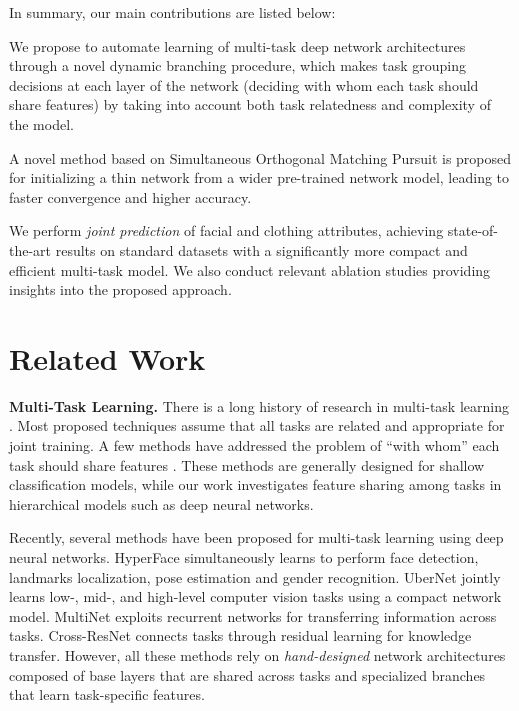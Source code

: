 \documentclass[10pt,twocolumn,letterpaper]{article}
\begin{document}
\noindent In summary, our main contributions are listed below:
\begin{compactitem}[$\circ$]
	\item We propose to automate learning of multi-task deep network architectures through a novel dynamic branching procedure,
	which makes task grouping decisions at each layer of the network (deciding with whom each task should share features) by 
	taking into account both task relatedness and complexity of the model.
	
	\item A novel method based on Simultaneous Orthogonal Matching Pursuit is proposed for initializing a thin network from a wider pre-trained network model,
	leading to faster convergence and higher accuracy.
	
	\item We perform {\em joint prediction} of facial and clothing attributes, achieving state-of-the-art results on standard datasets with a significantly 
	more compact and efficient multi-task model.  We also conduct relevant ablation studies providing insights into the proposed approach. 
\end{compactitem}


\section{Related Work}

{\bf Multi-Task Learning.} There is a long history of research in multi-task learning \cite{Caruana97,Thrun98,jacob2009clustered,Abhishek12,Misra16}. Most proposed techniques assume that all tasks are related and appropriate for joint training. A few methods have addressed the problem of ``with whom'' each task should share features \cite{xue2007multi,jacob2009clustered,zhou2011clustered,Kristen11,Abhishek12,passos2012flexible}. These methods are generally designed for shallow classification models, while our work investigates feature sharing among tasks in hierarchical models such as deep neural networks.

Recently, several methods have been proposed for multi-task learning using deep neural networks. HyperFace \cite{HyperFace16} simultaneously learns to perform face detection, landmarks localization, pose estimation and gender recognition. UberNet \cite{UberNet16} jointly learns low-, mid-, and high-level computer vision tasks using a compact network model.  MultiNet \cite{MultiNet16} exploits recurrent networks for transferring information across tasks. Cross-ResNet \cite{Brendan16} connects tasks through residual learning for knowledge transfer. However, all these methods rely on {\em hand-designed} network architectures composed of base layers that are shared across tasks and specialized branches that learn task-specific features.
\end{document}
